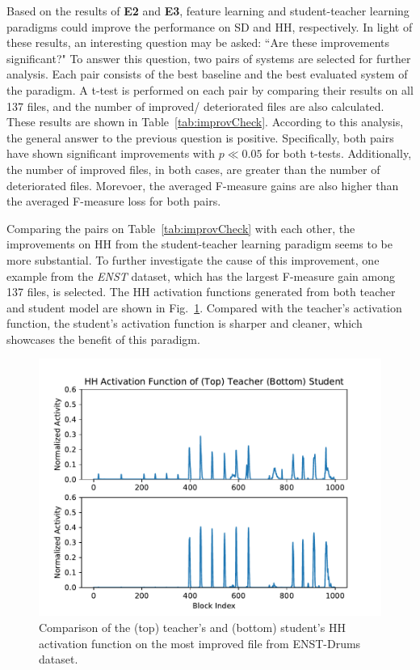 \documentclass{article}
\begin{document}
Based on the results of \textbf{E2} and \textbf{E3}, feature learning and student-teacher learning paradigms could improve the performance on SD and HH, respectively. In light of these results, an interesting question may be asked: ``Are these improvements significant?" To answer this question, two pairs of systems are selected for further analysis. Each pair consists of the best baseline and the best evaluated system of the paradigm. A t-test is performed on each pair by comparing their results on all 137 files, and the number of improved/ deteriorated files are also calculated. These results are shown in Table~\ref{tab:improvCheck}. According to this analysis, the general answer to the previous question is positive. Specifically, both pairs have shown significant improvements with $p \ll 0.05$ for both t-tests. Additionally, the number of improved files, in both cases, are greater than the number of deteriorated files. Morevoer, the averaged F-measure gains are also higher than the averaged F-measure loss for both pairs.  

Comparing the pairs on Table~\ref{tab:improvCheck} with each other, the improvements on HH from the student-teacher learning paradigm seems to be more substantial. To further investigate the cause of this improvement, one example from the \textit{ENST} dataset, which has the largest F-measure gain among 137 files, is selected. The HH activation functions generated from both teacher and student model are shown in Fig.~\ref{fig:exampleActiv}. Compared with the teacher's activation function, the student's activation function is sharper and cleaner, which showcases the benefit of this paradigm.

\begin{figure}
\centering
\includegraphics[width = \columnwidth]{./figs/example_activ.pdf}
\caption{Comparison of the (top) teacher's and (bottom) student's HH activation function on the most improved file from ENST-Drums dataset.}
\label{fig:exampleActiv}
\end{figure}
\end{document}
